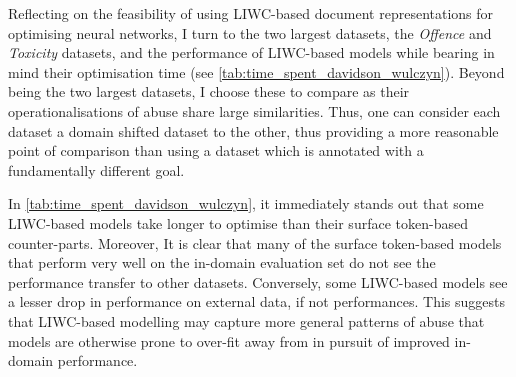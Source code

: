 Reflecting on the feasibility of using LIWC-based document representations for optimising neural networks, I turn to the two largest datasets, the \textit{Offence} and \textit{Toxicity} datasets, and the performance of LIWC-based models while bearing in mind their optimisation time (see \cref{tab:time_spent_davidson_wulczyn}).  
Beyond being the two largest datasets, I choose these to compare as their operationalisations of abuse share large similarities.  
Thus, one can consider each dataset a domain shifted dataset to the other, thus providing a more reasonable point of comparison than using a dataset which is annotated with a fundamentally different goal.  
  
In \cref{tab:time_spent_davidson_wulczyn}, it immediately stands out that some LIWC-based models take longer to optimise than their surface token-based counter-parts.  
Moreover, It is clear that many of the surface token-based models that perform very well on the in-domain evaluation set do not see the performance transfer to other datasets.  
Conversely, some LIWC-based models  see a lesser drop in performance on external data, if not   performances.  
This suggests that LIWC-based modelling may capture more general patterns of abuse that models are otherwise prone to over-fit away from in pursuit of improved in-domain performance.  
  
